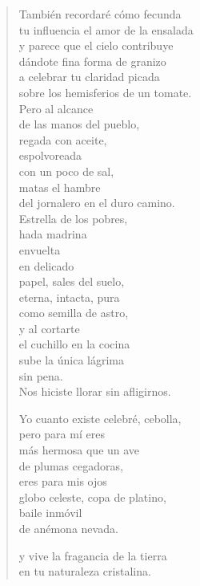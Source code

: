\documentclass[12pt]{article}
\begin{document}
\begin{verse}
También recordaré cómo fecunda\\
tu influencia el amor de la ensalada\\
y parece que el cielo contribuye\\
dándote fina forma de granizo\\
a celebrar tu claridad picada\\
sobre los hemisferios de un tomate.\\
Pero al alcance\\
de las manos del pueblo,\\
regada con aceite,\\
espolvoreada\\
con un poco de sal,\\
matas el hambre\\
del jornalero en el duro camino.\\
Estrella de los pobres,\\
hada madrina\\
envuelta\\
en delicado\\
papel, sales del suelo,\\
eterna, intacta, pura\\
como semilla de astro,\\
y al cortarte\\
el cuchillo en la cocina\\
sube la única lágrima\\
sin pena.\\
Nos hiciste llorar sin afligirnos.  

Yo cuanto existe celebré, cebolla,\\
pero para mí eres\\
más hermosa que un ave\\
de plumas cegadoras,\\
eres para mis ojos\\
globo celeste, copa de platino,\\
baile inmóvil\\
de anémona nevada.  

y vive la fragancia de la tierra\\
en tu naturaleza cristalina.  

\end{verse}
\end{document}

